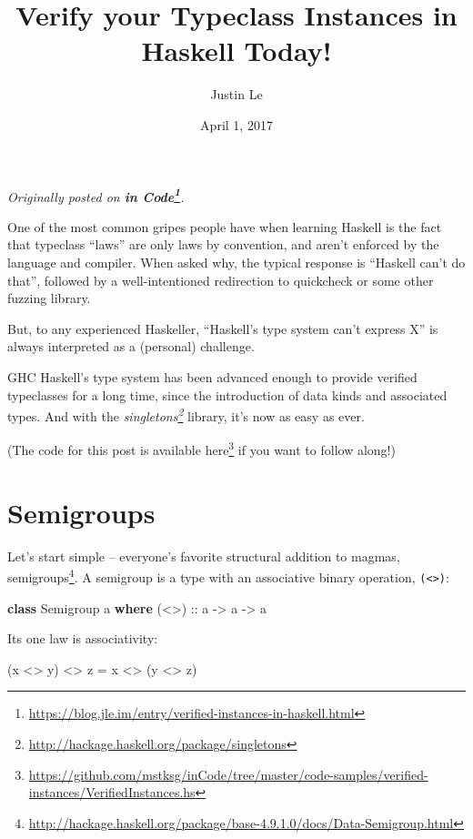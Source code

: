 \documentclass[]{article}
\title{Verify your Typeclass Instances in Haskell Today!}
\author{Justin Le}
\date{April 1, 2017}
\newenvironment{Shaded}{}{}
\newcommand{\DataTypeTok}[1]{\textcolor[rgb]{0.56,0.13,0.00}{#1}}
\newcommand{\FunctionTok}[1]{\textcolor[rgb]{0.02,0.16,0.49}{#1}}
\newcommand{\KeywordTok}[1]{\textcolor[rgb]{0.00,0.44,0.13}{\textbf{#1}}}
\newcommand{\NormalTok}[1]{#1}
\newcommand{\OtherTok}[1]{\textcolor[rgb]{0.00,0.44,0.13}{#1}}
\renewcommand{\href}[2]{#2\footnote{\url{#1}}}
\begin{document}
\maketitle

\emph{Originally posted on
\textbf{\href{https://blog.jle.im/entry/verified-instances-in-haskell.html}{in
Code}}.}

One of the most common gripes people have when learning Haskell is the fact that
typeclass ``laws'' are only laws by convention, and aren't enforced by the
language and compiler. When asked why, the typical response is ``Haskell can't
do that'', followed by a well-intentioned redirection to quickcheck or some
other fuzzing library.

But, to any experienced Haskeller, ``Haskell's type system can't express X'' is
always interpreted as a (personal) challenge.

GHC Haskell's type system has been advanced enough to provide verified
typeclasses for a long time, since the introduction of data kinds and associated
types. And with the
\emph{\href{http://hackage.haskell.org/package/singletons}{singletons}} library,
it's now as easy as ever.

(The code for this post is available
\href{https://github.com/mstksg/inCode/tree/master/code-samples/verified-instances/VerifiedInstances.hs}{here}
if you want to follow along!)

\hypertarget{semigroups}{%
\section{Semigroups}\label{semigroups}}

Let's start simple -- everyone's favorite structural addition to magmas,
\href{http://hackage.haskell.org/package/base-4.9.1.0/docs/Data-Semigroup.html}{semigroups}.
A semigroup is a type with an associative binary operation,
\texttt{(\textless{}\textgreater{})}:

\begin{Shaded}
\begin{Highlighting}[]
\KeywordTok{class} \DataTypeTok{Semigroup}\NormalTok{ a }\KeywordTok{where}
\OtherTok{    (<>) ::}\NormalTok{ a }\OtherTok{->}\NormalTok{ a }\OtherTok{->}\NormalTok{ a}
\end{Highlighting}
\end{Shaded}

Its one law is associativity:

\begin{Shaded}
\begin{Highlighting}[]
\NormalTok{(x }\FunctionTok{<>}\NormalTok{ y) }\FunctionTok{<>}\NormalTok{ z }\FunctionTok{=}\NormalTok{ x }\FunctionTok{<>}\NormalTok{ (y }\FunctionTok{<>}\NormalTok{ z)}
\end{Highlighting}
\end{Shaded}
\end{document}
